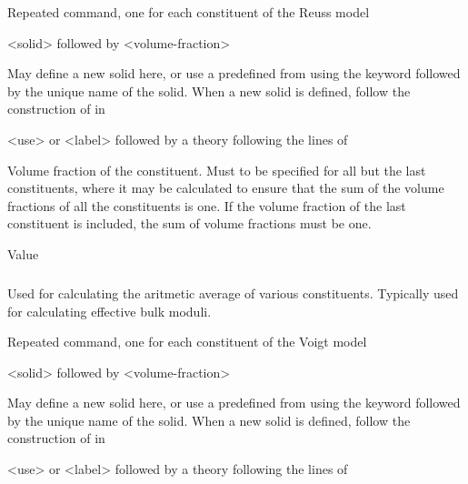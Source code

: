 {
 \slist
   \item \Description Repeated command, one for each constituent of the Reuss model
   \item \Argument <solid> followed by <volume-fraction>
   \item \Default
 \elist

 \slist
   \item \Description May define a new solid here, or use a predefined  from  using the keyword  followed by the unique name of the solid. When a new solid is defined, follow the construction of  in 
   \item \Argument <use> or <label> followed by a theory following the lines of 
   \item \Default
 \elist

 \slist
   \item \Description Volume fraction of the constituent. Must to be specified for all but the last constituents, where it may be calculated to ensure that the sum of the volume fractions of all the constituents is one. If the volume fraction of the last constituent is included, the sum of volume fractions must be one. 
   \item \Argument Value
   \item \Default
 \elist

\subparagraph{}
 \slist
   \item \Description Used for calculating the aritmetic average of various constituents. Typically used for calculating effective bulk moduli. 
   \item \Argument
   \item \Default 
 \elist

 \slist
   \item \Description Repeated command, one for each constituent of the Voigt model
   \item \Argument <solid> followed by <volume-fraction>
   \item \Default
 \elist

 \slist
   \item \Description May define a new solid here, or use a predefined  from  using the keyword  followed by the unique name of the solid. When a new solid is defined, follow the construction of  in 
   \item \Argument <use> or <label> followed by a theory following the lines of 
   \item \Default
 \elist

}
